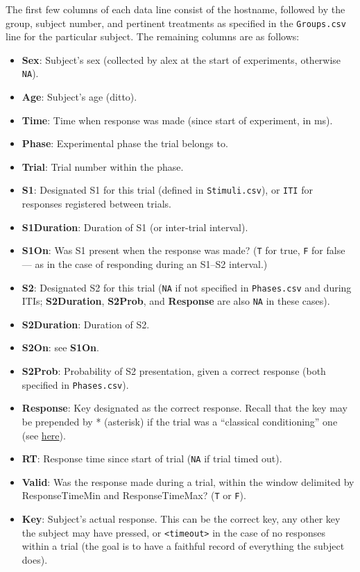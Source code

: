 \documentclass[11pt,]{article}
\begin{document}
The first few columns of each data line consist of the hostname,
followed by the group, subject number, and pertinent treatments as
specified in the \texttt{Groups.csv} line for the particular subject.
The remaining columns are as follows:

\begin{itemize}
\item
  \textbf{Sex}: Subject's sex (collected by alex at the start of
  experiments, otherwise \texttt{NA}).
\item
  \textbf{Age}: Subject's age (ditto).
\item
  \textbf{Time}: Time when response was made (since start of experiment,
  in ms).
\item
  \textbf{Phase}: Experimental phase the trial belongs to.
\item
  \textbf{Trial}: Trial number within the phase.
\item
  \textbf{S1}: Designated S1 for this trial (defined in
  \texttt{Stimuli.csv}), or \texttt{ITI} for responses registered
  between trials.
\item
  \textbf{S1Duration}: Duration of S1 (or inter-trial interval).
\item
  \textbf{S1On}: Was S1 present when the response was made? (\texttt{T}
  for true, \texttt{F} for false --- as in the case of responding during
  an S1--S2 interval.)
\item
  \textbf{S2}: Designated S2 for this trial (\texttt{NA} if not
  specified in \texttt{Phases.csv} and during ITIs; \textbf{S2Duration},
  \textbf{S2Prob}, and \textbf{Response} are also \texttt{NA} in these
  cases).
\item
  \textbf{S2Duration}: Duration of S2.
\item
  \textbf{S2On}: see \textbf{S1On}.
\item
  \textbf{S2Prob}: Probability of S2 presentation, given a correct
  response (both specified in \texttt{Phases.csv}).
\item
  \textbf{Response}: Key designated as the correct response. Recall that
  the key may be prepended by * (asterisk) if the trial was a
  ``classical conditioning'' one (see \hyperref[responses]{here}).
\item
  \textbf{RT}: Response time since start of trial (\texttt{NA} if trial
  timed out).
\item
  \textbf{Valid}: Was the response made during a trial, within the
  window delimited by ResponseTimeMin and ResponseTimeMax? (\texttt{T}
  or \texttt{F}).
\item
  \textbf{Key}: Subject's actual response. This can be the correct key,
  any other key the subject may have pressed, or
  \texttt{\textless{}timeout\textgreater{}} in the case of no responses
  within a trial (the goal is to have a faithful record of everything
  the subject does).
\end{itemize}
\end{document}
